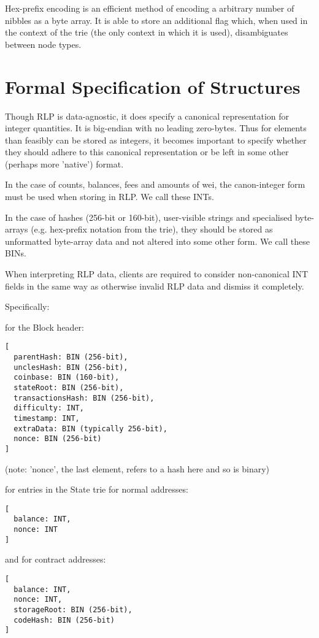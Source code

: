 \documentclass[9pt,oneside]{amsart}
\begin{document}
Hex-prefix encoding is an efficient method of encoding a arbitrary number of nibbles as a byte array. It is able to store an additional flag which, when used in the context of the trie (the only context in which it is used), disambiguates between node types.

\section{Formal Specification of Structures}

Though RLP is data-agnostic, it does specify a canonical representation for integer quantities. It is big-endian with no leading zero-bytes. Thus for elements than feasibly can be stored as integers, it becomes important to specify whether they should adhere to this canonical representation or be left in some other (perhaps more 'native') format.

In the case of counts, balances, fees and amounts of wei, the canon-integer form must be used when storing in RLP. We call these INTs.

In the case of hashes (256-bit or 160-bit), user-visible strings and specialised byte-arrays (e.g. hex-prefix notation from the trie), they should be stored as unformatted byte-array data and not altered into some other form. We call these BINs.

When interpreting RLP data, clients are required to consider non-canonical INT fields in the same way as otherwise invalid RLP data and dismiss it completely.

Specifically:

for the Block header:
\begin{verbatim}
[
  parentHash: BIN (256-bit),
  unclesHash: BIN (256-bit),
  coinbase: BIN (160-bit),
  stateRoot: BIN (256-bit),
  transactionsHash: BIN (256-bit),
  difficulty: INT,
  timestamp: INT,
  extraData: BIN (typically 256-bit),
  nonce: BIN (256-bit)
]
\end{verbatim}

(note: 'nonce', the last element, refers to a hash here and so is binary)

for entries in the State trie for normal addresses:
\begin{verbatim}
[
  balance: INT,
  nonce: INT
]
\end{verbatim}

and for contract addresses:
\begin{verbatim}
[
  balance: INT,
  nonce: INT,
  storageRoot: BIN (256-bit),
  codeHash: BIN (256-bit)
]
\end{verbatim}
\end{document}
